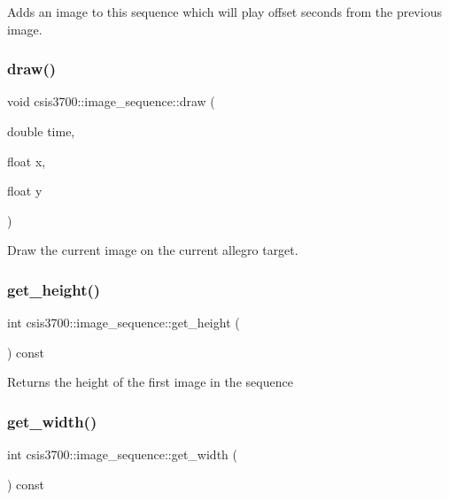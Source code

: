 Adds an image to this sequence which will play offset seconds from the previous image. \mbox{\label{classcsis3700_1_1image__sequence_a4a7dadd01b965db2052439584171f7a6}} 
\subsubsection{\texorpdfstring{draw()}{draw()}}
{\footnotesize\ttfamily void csis3700\+::image\+\_\+sequence\+::draw (\begin{DoxyParamCaption}\item[{double}]{time,  }\item[{float}]{x,  }\item[{float}]{y }\end{DoxyParamCaption})}

Draw the current image on the current allegro target. \mbox{\label{classcsis3700_1_1image__sequence_a278c951b17b59580c872600e91c9a265}} 
\subsubsection{\texorpdfstring{get\+\_\+height()}{get\_height()}}
{\footnotesize\ttfamily int csis3700\+::image\+\_\+sequence\+::get\+\_\+height (\begin{DoxyParamCaption}{ }\end{DoxyParamCaption}) const}

Returns the height of the first image in the sequence \mbox{\label{classcsis3700_1_1image__sequence_ad57c13fa3887f421b1b691c442d3e902}} 
\subsubsection{\texorpdfstring{get\+\_\+width()}{get\_width()}}
{\footnotesize\ttfamily int csis3700\+::image\+\_\+sequence\+::get\+\_\+width (\begin{DoxyParamCaption}{ }\end{DoxyParamCaption}) const}

